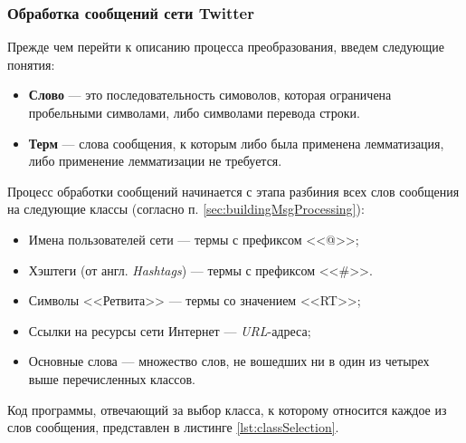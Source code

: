     \subsubsection{Обработка сообщений сети Twitter}
    Прежде чем перейти к описанию процесса преобразования, введем следующие
    понятия:
    \begin{itemize}
        \item {\bf Слово} --- это последовательность симоволов, которая ограничена
            пробельными символами, либо символами перевода строки.
        \item {\bf Терм} --- слова сообщения, к которым либо была применена
            лемматизация, либо применение лемматизации не требуется.
    \end{itemize}


    Процесс обработки сообщений начинается с этапа разбиния всех слов сообщения
    на следующие классы (согласно п. \ref{sec:buildingMsgProcessing}):
    \begin{itemize}
        \item Имена пользователей сети \twitter --- термы с префиксом <<@>>;
        \item Хэштеги (от англ. {\it Hashtags}) --- термы с префиксом <<\#>>.
        \item Символы <<Ретвита>> --- термы со значением <<RT>>;
        \item Ссылки на ресурсы сети Интернет --- {\it URL\hspace{1pt}}-адреса;
        \item Основные слова --- множество слов, не вошедших ни в один из четырех
            выше перечисленных классов.
    \end{itemize}

    Код программы, отвечающий за выбор класса, к которому относится каждое из
    слов сообщения, представлен в листинге \ref{lst:classSelection}.

    \lstset{style=python}
    

